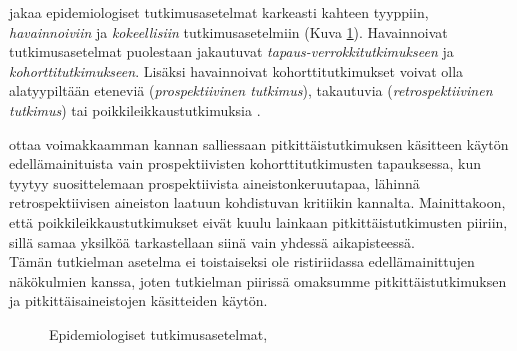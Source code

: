 \documentclass[finnish]{docopts}
\begin{document}
\cite{twisk13} jakaa epidemiologiset tutkimusasetelmat karkeasti kahteen tyyppiin, \textit{havainnoiviin} ja \textit{kokeellisiin} tutkimusasetelmiin (Kuva \ref{fig:epikaavio}). Havainnoivat tutkimusasetelmat puolestaan jakautuvat \textit{tapaus-verrokkitutkimukseen} ja \textit{kohorttitutkimukseen}. Lisäksi havainnoivat kohorttitutkimukset voivat olla alatyypiltään eteneviä (\textit{prospektiivinen tutkimus}), takautuvia (\textit{retrospektiivinen tutkimus}) tai poikkileikkaustutkimuksia \cite{diggle02, twisk13}.

\citeauthor{twisk13} ottaa voimakkaamman kannan salliessaan pitkittäistutkimuksen käsitteen käytön edellämainituista vain prospektiivisten kohorttitutkimusten tapauksessa, kun \citeauthor{diggle02} tyytyy suosittelemaan prospektiivista aineistonkeruutapaa, lähinnä retrospektiivisen aineiston laatuun kohdistuvan kritiikin kannalta. Mainittakoon, että poikkileikkaustutkimukset eivät kuulu lainkaan pitkittäistutkimusten piiriin, sillä samaa yksilköä tarkastellaan siinä vain yhdessä aikapisteessä.\\

Tämän tutkielman asetelma ei toistaiseksi ole ristiriidassa edellämainittujen näkökulmien kanssa, joten tutkielman piirissä omaksumme pitkittäistutkimuksen ja pitkittäisaineistojen käsitteiden käytön. 

\begin{figure}
\centering
{}
\caption{Epidemiologiset tutkimusasetelmat, \cite{twisk13}}
\label{fig:epikaavio}
\end{figure}
\end{document}
